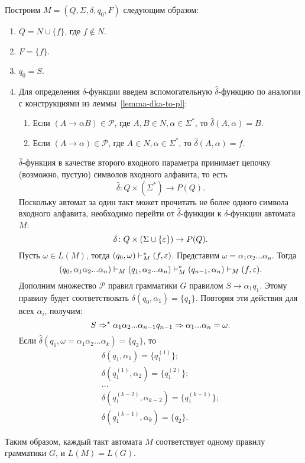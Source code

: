 \begin{myproof}
Построим $M = (Q, \Sigma, \delta, q_0, F)$ следующим образом:
\begin{enumerate}
	\item $Q = N \cup \{ f \}$, где $f \notin N$.
	\item $F = \{ f \}$.
	\item $q_0 = S$.
	\item Для определения $\delta$-функции введем вспомогательную $\hat{\delta}$-функцию по аналогии с конструкциями из леммы~\ref{lemma-dka-to-pl}:
		\begin{enumerate}
			\item Если $(A \to \alpha B)\in \mathcal P$, где $A, B \in N, \alpha \in \Sigma^*$, то $\hat{\delta}(A, \alpha) = B$.
			\item Если $(A \to \alpha)\in \mathcal P$, где $A \in N, \alpha \in \Sigma^*$, то $\hat{\delta}(A, \alpha) = f$.
		\end{enumerate}
		$\hat{\delta}$-функция в качестве второго входного параметра принимает цепочку (возможно, пустую) символов входного алфавита, то есть
		\[
			\hat{\delta} \colon Q \times (\Sigma^*) \to P(Q).
		\]
		Поскольку автомат за один такт может прочитать не более одного символа входного алфавита, необходимо перейти от $\hat{\delta}$-функции к $\delta$-функции автомата $M$:
		\[
			\delta \colon Q \times (\Sigma \cup \{ \varepsilon \} ) \to P(Q).
		\]
		Пусть $\omega \in L(M)$, тогда $(q_0,\omega)\vdash_M^*(f,\varepsilon)$.
		Представим $\omega = \alpha_1\alpha_2...\alpha_n$. Тогда
		\[
			(q_0, \alpha_1\alpha_2...\alpha_n)\vdash_M(q_1, \alpha_2...\alpha_n)\vdash_M^*(q_{n-1}, \alpha_n)\vdash_M(f, \varepsilon).
		\]
Дополним множество $\mathcal P$ правил грамматики $G$ правилом $S \to \alpha_1q_1$. Этому правилу будет соответствовать $\delta(q_0, \alpha_1) = \{q_1\}$.
		Повторяя эти действия для всех $\alpha_i$, получим:
		\[
			S \Rightarrow^* \alpha_1\alpha_2...\alpha_{n-1}q_{n-1} \Rightarrow \alpha_1...\alpha_n = \omega.
		\]
		Если $\hat{\delta}(q_1, \omega = \alpha_1\alpha_2...\alpha_k) = \{q_2\}$, то
		\[
			\begin{array}{l}
			\delta(q_1, \alpha_1) = \{q_1^{(1)}\};  \\
			\delta(q_1^{(1)}, \alpha_2) = \{q_1^{(2)}\}; \\
			... \\
			\delta(q_1^{(k-2)}, \alpha_{k-2}) = \{q_1^{(k-1)}\};\\
			\delta(q_1^{(k-1)}, \alpha_k) = \{q_2\}.
			\end{array}
		\]
	\end{enumerate}
	Таким образом, каждый такт автомата $M$ соответствует одному правилу грамматики $G$, и $L(M) = L(G)$.
\end{myproof}
